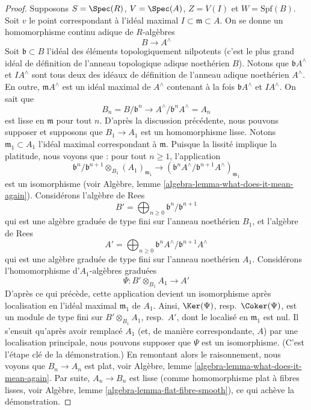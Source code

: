 \begin{proof}
\medskip\noindent
Supposons $S = \Spec(R)$, $V = \Spec(A)$, $Z = V(I)$ et $W = \text{Spf}(B)$.
Soit $v$ le point correspondant à l'idéal maximal $I \subset \mathfrak m \subset A$.
On se donne un homomorphisme continu adique de $R$-algèbres
$$
B \longrightarrow A^\wedge
$$
Soit $\mathfrak b \subset B$ l'idéal des éléments topologiquement nilpotents
(c'est le plus grand idéal de définition de l'anneau topologique adique
noethérien $B$). Notons que $\mathfrak b A^\wedge$ et
$IA^\wedge$ sont tous deux des idéaux de définition de l'anneau adique
noethérien $A^\wedge$. En outre, $\mathfrak m A^\wedge$ est un idéal maximal
de $A^\wedge$ contenant à la fois $\mathfrak b A^\wedge$ et $IA^\wedge$.
On sait que
$$
B_n = B/\mathfrak b^n \to A^\wedge/\mathfrak b^n A^\wedge = A_n
$$
est lisse en $\mathfrak m$ pour tout $n$. D'après la discussion précédente,
nous pouvons supposer et supposons que $B_1 \to A_1$ est un homomorphisme lisse.
Notons $\mathfrak m_1 \subset A_1$ l'idéal maximal correspondant
à $\mathfrak m$. Puisque la lissité implique la platitude, nous voyons que :
pour tout $n \geq 1$, l'application
$$
\mathfrak b^n/\mathfrak b^{n + 1} \otimes_{B_1} (A_1)_{\mathfrak m_1}
\longrightarrow
\left(\mathfrak b^nA^\wedge/\mathfrak b^{n + 1}A^\wedge\right)_{\mathfrak m_1}
$$
est un isomorphisme (voir
Algèbre, lemme \ref{algebra-lemma-what-does-it-mean-again}).
Considérons l'algèbre de Rees
$$
B' = \bigoplus\nolimits_{n \geq 0} \mathfrak b^n/\mathfrak b^{n + 1}
$$
qui est une algèbre graduée de type fini sur l'anneau noethérien $B_1$, et
l'algèbre de Rees
$$
A' = \bigoplus\nolimits_{n \geq 0}
\mathfrak b^nA^\wedge/\mathfrak b^{n + 1}A^\wedge
$$
qui est une algèbre graduée de type fini sur l'anneau noethérien $A_1$.
Considérons l'homomorphisme d'$A_1$-algèbres graduées
$$
\Psi : B' \otimes_{B_1} A_1 \longrightarrow A'
$$
D'après ce qui précède, cette application devient un isomorphisme après localisation en
l'idéal maximal $\mathfrak m_1$ de $A_1$.
Ainsi, $\Ker(\Psi)$, resp.\ $\Coker(\Psi)$, est un module de type fini
sur $B' \otimes_{B_1} A_1$, resp.\ $A'$, dont le localisé
en $\mathfrak m_1$ est nul. Il s'ensuit qu'après avoir remplacé
$A_1$ (et, de manière correspondante, $A$) par une localisation principale,
nous pouvons supposer que $\Psi$ est un isomorphisme. (C'est l'étape clé de la démonstration.)
En remontant alors le raisonnement, nous voyons que $B_n \to A_n$ est plat, voir
Algèbre, lemme \ref{algebra-lemma-what-does-it-mean-again}.
Par suite, $A_n \to B_n$ est lisse (comme homomorphisme plat à
fibres lisses, voir Algèbre, lemme \ref{algebra-lemma-flat-fibre-smooth}),
ce qui achève la démonstration.
\end{proof}

